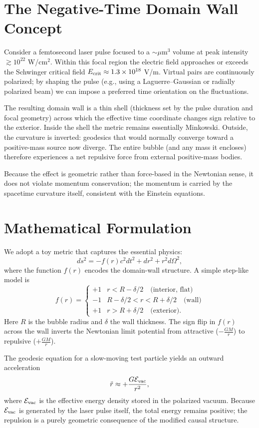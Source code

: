 \documentclass[11pt,a4paper]{article}
\begin{document}
\section{The Negative-Time Domain Wall Concept}

Consider a femtosecond laser pulse focused to a $\sim \mu$m$^3$ volume at peak intensity $\gtrsim 10^{22}$ W/cm$^2$. Within this focal region the electric field approaches or exceeds the Schwinger critical field $E_{\rm crit} \approx 1.3 \times 10^{18}$ V/m. Virtual pairs are continuously polarized; by shaping the pulse (e.g., using a Laguerre--Gaussian or radially polarized beam) we can impose a preferred time orientation on the fluctuations.

The resulting domain wall is a thin shell (thickness set by the pulse duration and focal geometry) across which the effective time coordinate changes sign relative to the exterior. Inside the shell the metric remains essentially Minkowski. Outside, the curvature is inverted: geodesics that would normally converge toward a positive-mass source now diverge. The entire bubble (and any mass it encloses) therefore experiences a net repulsive force from external positive-mass bodies.

Because the effect is geometric rather than force-based in the Newtonian sense, it does not violate momentum conservation; the momentum is carried by the spacetime curvature itself, consistent with the Einstein equations.

\section{Mathematical Formulation}

We adopt a toy metric that captures the essential physics:
\[
ds^2 = -f(r) c^2 dt^2 + dr^2 + r^2 d\Omega^2,
\]
where the function $f(r)$ encodes the domain-wall structure. A simple step-like model is
\[
f(r) = 
\begin{cases}
+1 & r < R - \delta/2 \quad \text{(interior, flat)} \\
-1 & R - \delta/2 < r < R + \delta/2 \quad \text{(wall)} \\
+1 & r > R + \delta/2 \quad \text{(exterior)}.
\end{cases}
\]
Here $R$ is the bubble radius and $\delta$ the wall thickness. The sign flip in $f(r)$ across the wall inverts the Newtonian limit potential from attractive ($-\frac{GM}{r}$) to repulsive ($+\frac{GM}{r}$).

The geodesic equation for a slow-moving test particle yields an outward acceleration
\[
\ddot{r} \approx +\frac{G \mathcal{E}_{\rm vac}}{r^2},
\]
where $\mathcal{E}_{\rm vac}$ is the effective energy density stored in the polarized vacuum. Because $\mathcal{E}_{\rm vac}$ is generated by the laser pulse itself, the total energy remains positive; the repulsion is a purely geometric consequence of the modified causal structure.
\end{document}
